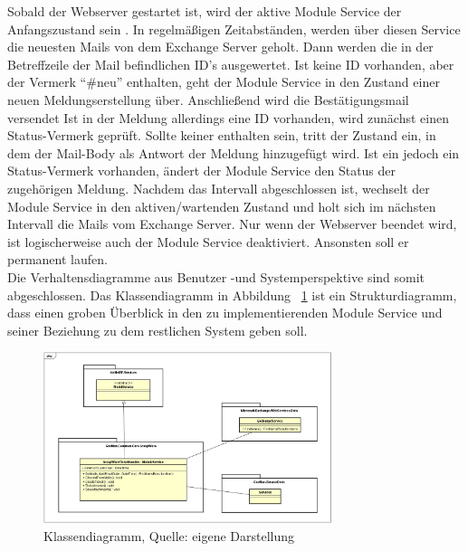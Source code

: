 \noindent
Sobald der Webserver gestartet ist, wird  der aktive Module Service der Anfangszustand sein . In regelmäßigen Zeitabständen, werden über diesen Service die neuesten Mails von dem Exchange Server geholt. Dann werden die in der Betreffzeile der Mail befindlichen ID's ausgewertet. Ist keine ID vorhanden, aber der Vermerk \enquote{\#neu} enthalten, geht der Module Service in den Zustand einer neuen Meldungserstellung über. Anschließend wird die Bestätigungsmail versendet\newline
Ist in der Meldung allerdings eine ID vorhanden, wird zunächst einen Status-Vermerk geprüft. Sollte keiner enthalten sein, tritt der Zustand ein, in dem der Mail-Body als Antwort der Meldung hinzugefügt wird. Ist ein jedoch ein Status-Vermerk vorhanden, ändert der Module Service den Status der zugehörigen Meldung.\newline
Nachdem das Intervall abgeschlossen ist, wechselt der Module Service in den aktiven/wartenden Zustand und holt sich im nächsten Intervall die Mails vom Exchange Server. Nur wenn der Webserver beendet wird, ist logischerweise auch der Module Service deaktiviert. Ansonsten soll er permanent laufen.\\

\noindent
Die Verhaltensdiagramme aus Benutzer -und Systemperspektive sind somit abgeschlossen. Das Klassendiagramm in Abbildung ~\ref{fig:Klassendiagramm} ist ein Strukturdiagramm, dass einen groben Überblick in den zu implementierenden Module Service und seiner Beziehung zu dem restlichen System geben soll. 

\begin{figure}[h!]
\centering
\includegraphics[width=0.75\textwidth]{Abbildungen/Klassendiagramm.png}
	\caption[Klassendiagramm]{Klassendiagramm, Quelle: eigene Darstellung}
	\label{fig:Klassendiagramm}
\end{figure}

